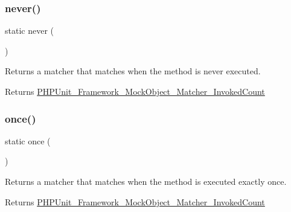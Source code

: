 \subsubsection{\texorpdfstring{never()}{never()}}
{\footnotesize\ttfamily static never (\begin{DoxyParamCaption}{ }\end{DoxyParamCaption})\hspace{0.3cm}{\ttfamily [static]}}

Returns a matcher that matches when the method is never executed.

\begin{DoxyReturn}{Returns}
\mbox{\hyperlink{class_p_h_p_unit___framework___mock_object___matcher___invoked_count}{P\+H\+P\+Unit\+\_\+\+Framework\+\_\+\+Mock\+Object\+\_\+\+Matcher\+\_\+\+Invoked\+Count}} 
\end{DoxyReturn}
\mbox{\label{class_p_h_p_unit___framework___test_case_a0a4754041df65e1fc4fbf69b8640cc70}} 
\subsubsection{\texorpdfstring{once()}{once()}}
{\footnotesize\ttfamily static once (\begin{DoxyParamCaption}{ }\end{DoxyParamCaption})\hspace{0.3cm}{\ttfamily [static]}}

Returns a matcher that matches when the method is executed exactly once.

\begin{DoxyReturn}{Returns}
\mbox{\hyperlink{class_p_h_p_unit___framework___mock_object___matcher___invoked_count}{P\+H\+P\+Unit\+\_\+\+Framework\+\_\+\+Mock\+Object\+\_\+\+Matcher\+\_\+\+Invoked\+Count}} 
\end{DoxyReturn}
\mbox{\label{class_p_h_p_unit___framework___test_case_a8dffb4554ade13222400d1a65349b6d9}} 
